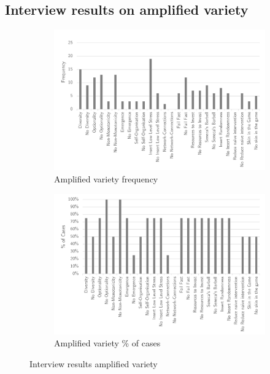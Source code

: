 \subsection{Interview results on amplified variety}
\label{sub:interviewresultsaplified}
\begin{figure}[H]
	\centering
	\begin{subfigure}[H]{0.5\textwidth}
		\centering
		\includegraphics[width=0.95\linewidth]{images/amplified_frequency}
		\caption[Amplified variety frequency]{Amplified variety frequency}
		\label{fig:amplifiedfrequency}
	\end{subfigure}%
	\begin{subfigure}[H]{0.5\textwidth}
		\centering
		\includegraphics[width=0.95\linewidth]{images/amplified_cases}
		\caption[Amplified variety \% of cases]{Amplified variety \% of cases}
		\label{fig:amplifiedcases}
	\end{subfigure}
	\caption[Interview results amplified variety]{Interview results amplified variety}
	\label{fig:interviewamplifiedvariety}
\end{figure}

